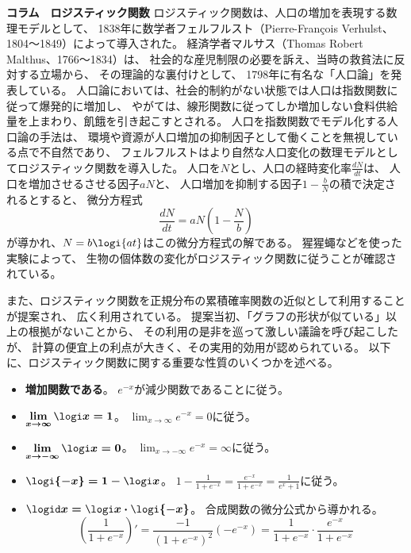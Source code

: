 \newpage
\begin{itembox}{\bf コラム　ロジスティック関数}
ロジスティック関数は、人口の増加を表現する数理モデルとして、
1838年に数学者フェルフルスト（Pierre-François Verhulst、1804〜1849）によって導入された。
経済学者マルサス（Thomas Robert Malthus、1766〜1834）は、
社会的な産児制限の必要を訴え、当時の救貧法に反対する立場から、
その理論的な裏付けとして、
1798年に有名な「人口論」を発表している。
人口論においては、社会的制約がない状態では人口は指数関数に従って爆発的に増加し、
やがては、線形関数に従ってしか増加しない食料供給量を上まわり、飢餓を引き起こすとされる。
人口を指数関数でモデル化する人口論の手法は、
環境や資源が人口増加の抑制因子として働くことを無視している点で不自然であり、
フェルフルストはより自然な人口変化の数理モデルとしてロジスティック関数を導入した。
人口を$N$とし、人口の経時変化率$\frac{dN}{dt}$は、
人口を増加させるさせる因子$aN$と、
人口増加を抑制する因子$1 - \frac bN$の積で決定されるとすると、
微分方程式
\[
  \frac{dN}{dt} = aN\left(1 - \frac Nb\right)
\]
が導かれ、$N = b \logi{at}$はこの微分方程式の解である。
猩猩蠅などを使った実験によって、
生物の個体数の変化がロジスティック関数に従うことが確認されている。

また、ロジスティック関数を正規分布の累積確率関数の近似として利用することが提案され、
広く利用されている。
提案当初、「グラフの形状が似ている」以上の根拠がないことから、
その利用の是非を巡って激しい議論を呼び起こしたが、
計算の便宜上の利点が大きく、その実用的効用が認められている。
以下に、ロジスティック関数に関する重要な性質のいくつかを述べる。
\begin{itemize}
\item \textbf{増加関数である}。
  $e^{-x}$が減少関数であることに従う。
\item $\displaystyle \boldsymbol{\lim_{x \to \infty} \logi x = 1}$。
  $\displaystyle \lim_{x \to \infty} e^{-x} = 0$に従う。
\item $\displaystyle \boldsymbol{\lim_{x \to - \infty} \logi x = 0}$。
  $\displaystyle \lim_{x \to - \infty} e^{-x} = \infty$に従う。
\item $\boldsymbol{\logi{-x} = 1 - \logi x}$。
  $ 1 - \frac 1{1 + e^{-x}} =
    \frac {e^{-x}}{1 + e^{-x}} = \frac 1{e^x + 1}$に従う。
  \item $\boldsymbol{\logid x = \logi x \cdot \logi{-x}}$。
    合成関数の微分公式から導かれる。
    \[
    \left(\frac 1{1 + e^{-x}}\right)'
    = \frac{-1}{(1 + e^{-x})^2}\left(-e^{-x}\right)
    = \frac 1{1 + e^{-x}}\cdot\frac{e^{-x}}{1 + e^{-x}}
    \]
\end{itemize}
\end{itembox}

